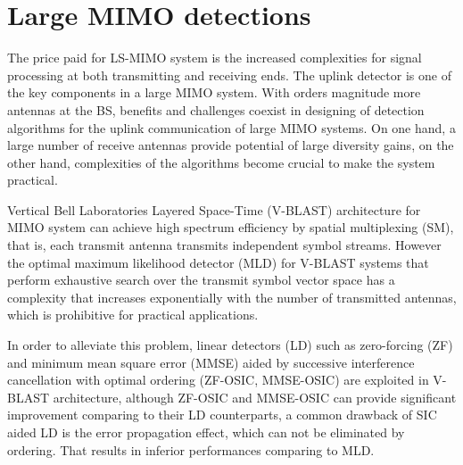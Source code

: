 \section{Large MIMO detections}
 The price paid for LS-MIMO system is the increased complexities for signal processing at both transmitting and receiving ends. The uplink detector is one of the key components in a large MIMO system. With orders magnitude more antennas at the BS, benefits and challenges coexist in designing of detection algorithms for the uplink communication of large MIMO systems. On one hand, a large number of receive antennas provide potential of large diversity gains, on the other hand, complexities of the algorithms become crucial to make the system practical. 
  
Vertical Bell Laboratories Layered Space-Time (V-BLAST) architecture for MIMO system can achieve high spectrum efficiency by spatial multiplexing (SM), that is, each transmit antenna transmits independent symbol streams. However the optimal maximum likelihood detector (MLD) for V-BLAST systems that perform exhaustive search over the transmit symbol vector space has a complexity that increases exponentially with the number of transmitted antennas, which is prohibitive for practical applications. 

In order to alleviate this problem, linear detectors (LD) such as zero-forcing (ZF) and minimum mean square error (MMSE) aided by successive interference cancellation with optimal ordering (ZF-OSIC, MMSE-OSIC) are exploited in V-BLAST architecture\cite{wolniansky1998v}\cite{foschini1999simplified}\cite{benesty2003fast}, although ZF-OSIC and MMSE-OSIC can provide significant improvement comparing to their LD counterparts, a common drawback of SIC aided LD is the error propagation effect, which can not be eliminated by ordering. That results in inferior performances comparing to MLD\cite{loyka2004performance}\cite{prasad2004analysis}\cite{jiang2005asymptotic}.
   
